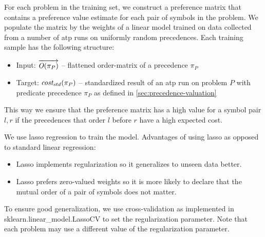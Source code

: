 For each problem in the training set, we construct a preference matrix that contains a preference
value estimate for each pair of symbols in the problem.
We populate the matrix by the weights of a linear model trained on data
collected from a number of \gls{atp} runs on uniformly random precedences.
Each training sample has the following structure:

\begin{itemize}
	\item Input: \(\overrightarrow{\operatorname{\mathit{O}}(\pi_P)}\) --
	flattened \gls{order-matrix} of a precedence \(\pi_P\)
	\item Target: \(\operatorname{\mathit{cost_{std}}}(\pi_P)\) --
	standardized result of an \gls{atp} run on problem \(P\) with predicate precedence \(\pi_P\)
	as defined in \autoref{sec:precedence-valuation}
\end{itemize}

This way we ensure that the preference matrix has a high value for a symbol pair \(l, r\)
if the precedences that order \(l\) before \(r\) have a high expected cost.

We use lasso regression \cite{?} to train the model.
Advantages of using lasso as opposed to standard linear regression\cite{?}:

\begin{itemize}
	\item Lasso implements regularization so it generalizes to unseen data better.
	\item Lasso prefers zero-valued weights so it is more likely to declare that the mutual order of a pair of symbols does not matter.
\end{itemize}

To ensure good generalization,
we use cross-validation as implemented in sklearn.linear\_model.LassoCV \cite{?}
to set the regularization parameter.
Note that each problem may use a different value of the regularization parameter.

